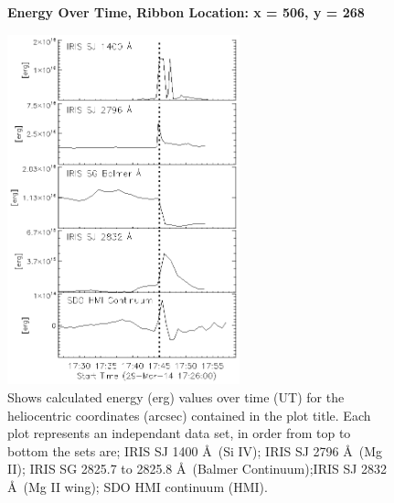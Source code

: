 \begin{figure}[H]
  \begin{center}
  \textbf{Energy Over Time, Ribbon Location: x = 506, y = 268 }\par\medskip
  \includegraphics[width=0.6\textwidth]{29-Mar-14-Ribbon-xyPosition-506-268-Frame-1-Energy-Ladder}
  \end{center}
  \caption{Shows calculated energy (erg) values over time (UT) for the heliocentric coordinates (arcsec) contained in the plot title. Each plot represents an independant data set, in order from top to bottom the sets are; IRIS SJ 1400 \AA\ (Si IV); IRIS SJ 2796 \AA\ (Mg II); IRIS SG  2825.7 to 2825.8 \AA\ (Balmer Continuum);IRIS SJ 2832 \AA\ (Mg II wing); SDO HMI continuum (HMI).}\label{erb8}
\end{figure}

